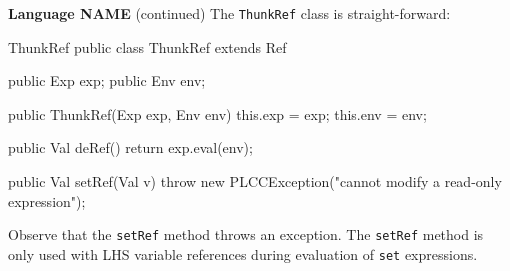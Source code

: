 \begin{minipage}[t]{\sw}
\slidenumber
\LARGE
{\bf Language NAME} (continued)\exx
The \verb'ThunkRef' class is straight-forward:
\large
\begin{qv}
ThunkRef
public class ThunkRef extends Ref {

    public Exp exp;
    public Env env;

    public ThunkRef(Exp exp, Env env) {
        this.exp = exp;
        this.env = env;
    }

    public Val deRef() {
        return exp.eval(env);
    }

    public Val setRef(Val v) {
        throw new PLCCException("cannot modify a read-only expression");
    }
}
\end{qv}
\LARGE
Observe that the \verb'setRef' method throws an exception.
The \verb'setRef' method is only used with LHS variable references
during evaluation of \verb'set' expressions.
\end{minipage}
\clearpage
